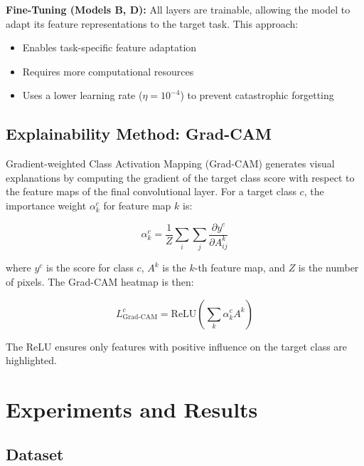 \documentclass[11pt,a4paper]{article}
\begin{document}
\textbf{Fine-Tuning (Models B, D):} All layers are trainable, allowing the model to adapt its feature representations to the target task. This approach:
\begin{itemize}
    \item Enables task-specific feature adaptation
    \item Requires more computational resources
    \item Uses a lower learning rate ($\eta = 10^{-4}$) to prevent catastrophic forgetting
\end{itemize}

\subsection{Explainability Method: Grad-CAM}

Gradient-weighted Class Activation Mapping (Grad-CAM) \citep{selvaraju2017grad} generates visual explanations by computing the gradient of the target class score with respect to the feature maps of the final convolutional layer. For a target class $c$, the importance weight $\alpha_k^c$ for feature map $k$ is:

\begin{equation}
\alpha_k^c = \frac{1}{Z} \sum_i \sum_j \frac{\partial y^c}{\partial A_{ij}^k}
\end{equation}

where $y^c$ is the score for class $c$, $A^k$ is the $k$-th feature map, and $Z$ is the number of pixels. The Grad-CAM heatmap is then:

\begin{equation}
L_{\text{Grad-CAM}}^c = \text{ReLU}\left(\sum_k \alpha_k^c A^k\right)
\end{equation}

The ReLU ensures only features with positive influence on the target class are highlighted.

\section{Experiments and Results}

\subsection{Dataset}
\end{document}
